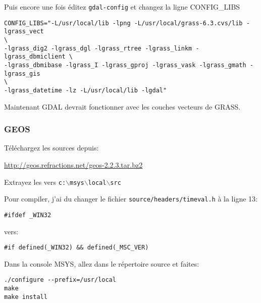 Puis encore une fois \'editez \texttt{gdal-config} et changez la ligne CONFIG\_LIBS

\begin{verbatim}
CONFIG_LIBS="-L/usr/local/lib -lpng -L/usr/local/grass-6.3.cvs/lib -lgrass_vect
\
-lgrass_dig2 -lgrass_dgl -lgrass_rtree -lgrass_linkm -lgrass_dbmiclient \
-lgrass_dbmibase -lgrass_I -lgrass_gproj -lgrass_vask -lgrass_gmath -lgrass_gis
\
-lgrass_datetime -lz -L/usr/local/lib -lgdal" 
\end{verbatim}

Maintenant GDAL devrait fonctionner avec les couches vecteurs de GRASS.

% 
% 
% 

\subsubsection{GEOS}
T\'el\'echargez les sources depuis:

\url{http://geos.refractions.net/geos-2.2.3.tar.bz2}

Extrayez les vers \texttt{c:$\backslash$msys$\backslash$local$\backslash$src}

Pour compiler, j'ai du changer le fichier \texttt{source/headers/timeval.h} \`a la ligne 13:

\begin{verbatim}
#ifdef _WIN32
\end{verbatim}
vers:

\begin{verbatim}
#if defined(_WIN32) && defined(_MSC_VER)
\end{verbatim}

Dans la console MSYS, allez dans le r\'epertoire source et faites:

\begin{verbatim}
./configure --prefix=/usr/local
make
make install
\end{verbatim}

